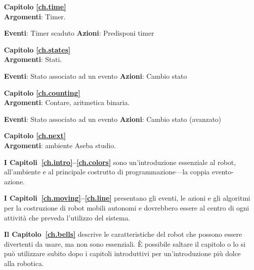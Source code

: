 {\centering \textbf{Capitolo \ref{ch.time}}\\}
\textbf{Argomenti}: Timer.

\textbf{Eventi}: Timer scaduto \hfill \textbf{Azioni}: Predisponi timer

 \hfill {}

\bigskip

{\centering \textbf{Capitolo \ref{ch.states}}\\}
\textbf{Argomenti}: Stati.

\textbf{Eventi}: Stato associato ad un evento \hfill \textbf{Azioni}: Cambio stato

 \hfill {}

\bigskip

{\centering \textbf{Capitolo \ref{ch.counting}}\\}
\textbf{Argomenti}: Contare, aritmetica binaria.

\textbf{Eventi}: Stato associato ad un evento  \hfill \textbf{Azioni}: Cambio stato (avanzato)

 \hfill {}

\bigskip

{\centering \textbf{Capitolo \ref{ch.next}}\\}
\textbf{Argomenti}: ambiente Aseba studio.

\bigskip




\textbf{I Capitoli~\ref{ch.intro}--\ref{ch.colors}} sono un'introduzione essenziale
al robot, all'ambiente e al principale costrutto di programmazione---la
coppia evento-azione.

\textbf{I Capitoli~\ref{ch.moving}--\ref{ch.line}} presentano gli eventi, le azioni e gli algoritmi
per la costruzione di robot mobili autonomi e dovrebbero essere al centro di ogni
attività che preveda l'utilizzo del sistema.

\textbf{Il Capitolo~\ref{ch.bells}} descrive le caratteristiche del robot che possono
essere divertenti da usare, ma non sono essenziali. È possibile saltare il capitolo o lo si può
utilizzare subito dopo i capitoli introduttivi
per un'introduzione più dolce alla robotica.

